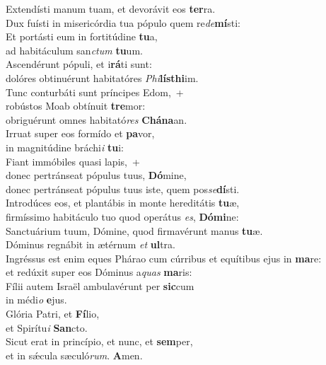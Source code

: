 \oddverse Extendísti manum tuam, et devorávit eos \textbf{ter}ra.~\*\\
\oddverse Dux fuísti in misericórdia tua pópulo quem re\textit{de}\textbf{mí}sti:\\
\evenverse Et portásti eum in fortitúdine \textbf{tu}a,~\*\\
\evenverse ad habitáculum san\textit{ctum} \textbf{tu}um.\\
\oddverse Ascendérunt pópuli, et i\textbf{rá}ti sunt:~\*\\
\oddverse dolóres obtinuérunt habitatóres \textit{Phi}\textbf{lís}\textbf{thi}im.\\
\evenverse Tunc conturbáti sunt príncipes Edom,~+\\
\evenverse  robústos Moab obtínuit \textbf{tre}mor:~\*\\
\evenverse obriguérunt omnes habitató\textit{res} \textbf{Chá}\textbf{na}an.\\
\oddverse Irruat super eos formído et \textbf{pa}vor,~\*\\
\oddverse in magnitúdine bráchi\textit{i} \textbf{tu}i:\\
\evenverse Fiant immóbiles quasi lapis,~+\\
\evenverse  donec pertránseat pópulus tuus, \textbf{Dó}mine,~\*\\
\evenverse donec pertránseat pópulus tuus iste, quem pos\textit{se}\textbf{dí}sti.\\
\oddverse Introdúces eos, et plantábis in monte hereditátis \textbf{tu}æ,~\*\\
\oddverse firmíssimo habitáculo tuo quod operátus \textit{es}, \textbf{Dó}\textbf{mi}ne:\\
\evenverse Sanctuárium tuum, Dómine, quod firmavérunt manus \textbf{tu}æ.~\*\\
\evenverse Dóminus regnábit in ætérnum \textit{et} \textbf{ul}tra.\\
\oddverse Ingréssus est enim eques Phárao cum cúrribus et equítibus ejus in \textbf{ma}re:~\*\\
\oddverse et redúxit super eos Dóminus a\textit{quas} \textbf{ma}ris:\\
\evenverse Fílii autem Israël ambulavérunt per \textbf{sic}cum~\*\\
\evenverse in médi\textit{o} \textbf{e}jus.\\
\oddverse Glória Patri, et \textbf{Fí}lio,~\*\\
\oddverse et Spirítu\textit{i} \textbf{San}cto.\\
\evenverse Sicut erat in princípio, et nunc, et \textbf{sem}per,~\*\\
\evenverse et in sǽcula sæculó\textit{rum}. \textbf{A}men.\\
